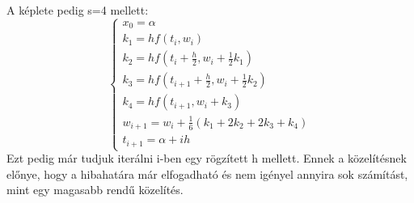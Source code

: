 \documentclass{article}
\theoremstyle{definition}
\theoremstyle{theorem}
\begin{document}
A képlete pedig s=4 mellett:
\begin{equation*}
\begin{cases}
        x_0 = \alpha \\
        k_1 = h f(t_i,w_i) \\
        k_2 = h f(t_i + \frac{h}{2}, w_i + \frac{1}{2} k_1) \\
        k_3 = h f(t_{i + 1} + \frac{h}{2}, w_i + \frac{1}{2} k_2) \\
        k_4 = h f(t_{i + 1}, w_i + k_3)\\
        w_{i+1} = w_i + \frac{1}{6}(k_1 + 2k_2 + 2k_3 + k_4)\\
        t_{i+1} = \alpha + ih
\end{cases}
\end{equation*}
Ezt pedig már tudjuk iterálni i-ben egy rögzített h mellett. Ennek a közelítésnek előnye, hogy a hibahatára már elfogadható és nem igényel annyira sok számítást, mint egy magasabb rendű közelítés.
\end{document}
